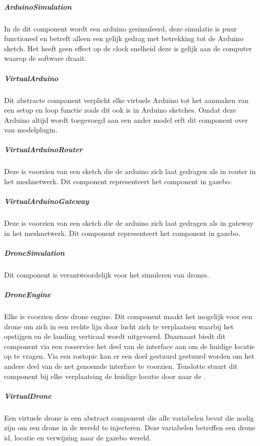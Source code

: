\documentclass[a4paper, 11pt, oneside]{report}
\begin{document}
\subparagraph{ArduinoSimulation}
\label{architectural:subcomponenten:ArduinoSimulation}
In de dit component wordt een arduino gesimuleerd, deze simulatie is puur functioneel en betreft alleen een gelijk gedrag met betrekking tot de Arduino sketch. 
Het heeft geen effect op de clock snelheid deze is gelijk aan de computer waarop de software draait. 

\subparagraph{VirtualArduino}
\label{architectural:subcomponenten:VirtualArduino}
Dit abstracte component verplicht elke virtuele Arduino tot het aanmaken van een setup en loop functie zoals dit ook is in Arduino sketches.
Omdat deze Arduino altijd wordt toegevoegd aan een ander model erft dit component over van modelplugin.    
 
\subparagraph{VirtualArduinoRouter}
\label{architectural:subcomponenten:VirtualArduinoRouter}
Deze  is voorzien van een sketch die de arduino zich laat gedragen als in router in het meshnetwerk. Dit component representeert het component  in gazebo.

\subparagraph{VirtualArduinoGateway}
\label{architectural:subcomponenten:VirtualArduinoGateway}
Deze  is voorzien van een sketch die de arduino zich laat gedragen als in gateway in het meshnetwerk. Dit component representeert het component  in gazebo.


\subparagraph{DroneSimulation}
\label{architectural:subcomponenten:DroneSimulation}
Dit component is verantwoordelijk voor het simuleren van drones. 

\subparagraph{DroneEngine}
\label{architectural:subcomponenten:DroneEngine}
Elke  is voorzien deze drone engine. 
Dit component maakt het mogelijk voor een drone om zich in een rechte lijn door lucht zich te verplaatsen waarbij het opstijgen en de landing verticaal wordt uitgevoerd.
Daarnaast biedt dit component via een rosservice het deel van de interface  aan om de huidige locatie op te vragen.
Via een rostopic kan er een doel gestuurd gestuurd worden om het andere deel van de net genoemde interface te voorzien.
Tenslotte stuurt dit component bij elke verplaatsing de huidige locatie door naar de . 

\subparagraph{VirtualDrone}
\label{architectural:subcomponenten:VirtualDrone}
Een virtuele drone is een abstract component die alle variabelen bevat die nodig zijn om een drone in de wereld te injecteren. Deze variabelen betreffen een drone id, locatie en verwijzing naar de gazebo wereld. 
\end{document}
